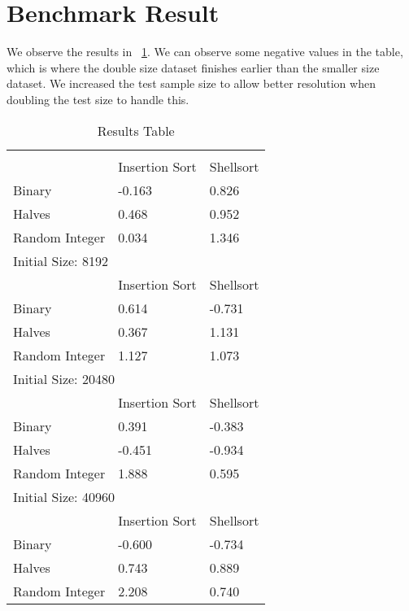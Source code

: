 \documentclass{article}
\begin{document}
\section{Benchmark Result}

We observe the results in ~\ref{tab:resultstable}. We can observe some negative values in the table, which is where the double size dataset finishes earlier than the smaller size dataset. We increased the test sample size to allow better resolution when doubling the test size to handle this.

\begin{table}[!ht]
\begin{tabular}{lll}
\rowcolor[HTML]{C9C9C9} 
\multicolumn{3}{l}{\cellcolor[HTML]{C9C9C9}Initial Size: 4096} \\
\rowcolor[HTML]{EFEFEF} 
                      & Insertion Sort       & Shellsort       \\
Binary                & -0.163               & 0.826           \\
\rowcolor[HTML]{EFEFEF} 
Halves                & 0.468	               & 0.952           \\
Random Integer        & 0.034                & 1.346           \\

\multicolumn{3}{l}{\cellcolor[HTML]{C9C9C9}Initial Size: 8192} \\
\rowcolor[HTML]{EFEFEF} 
                      & Insertion Sort       & Shellsort       \\
Binary                & 0.614                & -0.731          \\
\rowcolor[HTML]{EFEFEF} 
Halves                & 0.367                & 1.131           \\
Random Integer        & 1.127                & 1.073           \\
\multicolumn{3}{l}{\cellcolor[HTML]{C9C9C9}Initial Size: 20480} \\
\rowcolor[HTML]{EFEFEF} 
                      & Insertion Sort       & Shellsort       \\
Binary                & 0.391                & -0.383          \\
\rowcolor[HTML]{EFEFEF} 
Halves                & -0.451               & -0.934          \\
Random Integer        & 1.888                & 0.595           \\
\multicolumn{3}{l}{\cellcolor[HTML]{C9C9C9}Initial Size: 40960} \\
\rowcolor[HTML]{EFEFEF} 
                      & Insertion Sort       & Shellsort       \\
Binary                & -0.600               & -0.734          \\
\rowcolor[HTML]{EFEFEF} 
Halves                & 0.743                & 0.889           \\
Random Integer        & 2.208                & 0.740           
\end{tabular}
\caption{Results Table}
\label{tab:resultstable}
\end{table}
\end{document}
